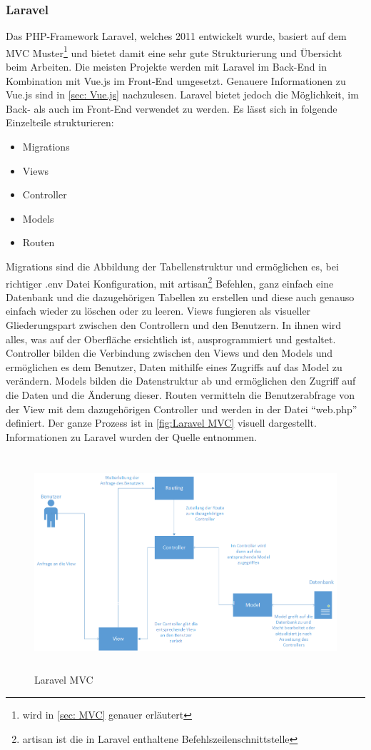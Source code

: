 \subsubsection{Laravel}
Das PHP-Framework Laravel, welches 2011 entwickelt wurde, basiert auf dem MVC Muster\footnote{wird in  \autoref{sec: MVC} genauer erläutert} und bietet damit eine sehr gute Strukturierung und Übersicht beim Arbeiten. Die meisten Projekte werden mit Laravel im Back-End in Kombination mit Vue.js im Front-End umgesetzt. Genauere Informationen zu Vue.js sind in \ref{sec: Vue.js} nachzulesen. Laravel bietet jedoch die Möglichkeit, im Back- als auch im Front-End verwendet zu werden. Es lässt sich in folgende Einzelteile strukturieren:

\begin{itemize}
	\item Migrations 
	\item Views
	\item Controller 
	\item Models
	\item Routen 
\end{itemize}

Migrations sind die Abbildung der Tabellenstruktur und ermöglichen es, bei richtiger .env Datei Konfiguration, mit artisan\footnote{artisan ist die in Laravel enthaltene Befehlszeilenschnittstelle} Befehlen, ganz einfach eine Datenbank und die dazugehörigen Tabellen zu erstellen und diese auch genauso einfach wieder zu löschen oder zu leeren. Views fungieren als visueller Gliederungspart zwischen den Controllern und den Benutzern. In ihnen wird alles, was auf der Oberfläche ersichtlich ist, ausprogrammiert und gestaltet. Controller bilden die Verbindung zwischen den Views und den Models und ermöglichen es dem Benutzer, Daten mithilfe eines Zugriffs auf das Model zu verändern. Models bilden die Datenstruktur ab und ermöglichen den Zugriff auf die Daten und die Änderung dieser. Routen vermitteln die Benutzerabfrage von der View mit dem dazugehörigen Controller und werden in der Datei “web.php” definiert. Der ganze Prozess ist in \autoref{fig:Laravel MVC} visuell dargestellt.  Informationen zu Laravel wurden der Quelle \cite{Wasist} entnommen.
\begin{figure}[h]
	\centering
	\includegraphics[height=8cm,width=15cm]{images/LaravelMVC}
	\caption{Laravel MVC}
	\label{fig:Laravel MVC}
\end{figure}
\newpage




